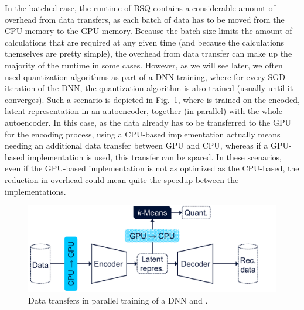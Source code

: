 		In the batched case, the runtime of \ac{BSQ} contains a considerable amount of overhead from data transfers, as each batch of data has to be moved from the \ac{CPU} memory to the \ac{GPU} memory.
		Because the batch size limits the amount of calculations that are required at any given time (and because the calculations themselves are pretty simple), the overhead from data transfer can make up the majority of the runtime in some cases.
		However, as we will see later, we often used quantization algorithms as part of a \ac{DNN} training, where for every \ac{SGD} iteration of the \ac{DNN}, the quantization algorithm is also trained (usually until it converges).
		Such a scenario is depicted in Fig.~\ref{fig:dnn_quant}, where \kmeans{} is trained on the encoded, latent representation in an autoencoder, together (in parallel) with the whole autoencoder.
		In this case, as the data already has to be transferred to the \ac{GPU} for the encoding process, using a \ac{CPU}-based implementation actually means needing an additional data transfer between \ac{GPU} and \ac{CPU}, whereas if a \ac{GPU}-based implementation is used, this transfer can be spared.
		In these scenarios, even if the \ac{GPU}-based implementation is not as optimized as the \ac{CPU}-based, the reduction in overhead could mean quite the speedup between the implementations.
		
		\begin{figure}[ht]
			\centering
			\includegraphics[width=0.8\linewidth]{figures/03_quantization/dnn_quant/dnn_quant.pdf}
			\caption[Data transfers in DNN training]{Data transfers in parallel training of a DNN and \kmeans{}.}
			\label{fig:dnn_quant}
		\end{figure}
		
